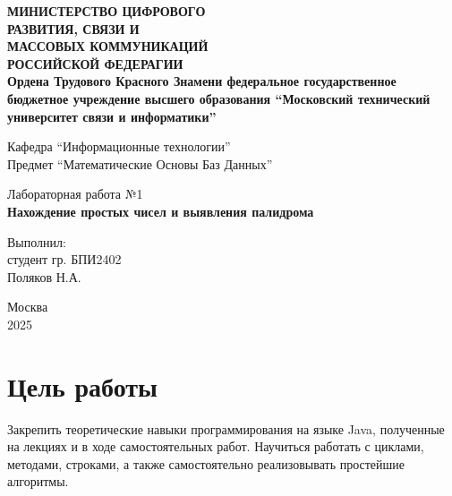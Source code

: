 \documentclass[a4paper, 17pt]{extarticle}
\begin{document}
\begin{titlepage}
  \begin{center}
    \small{ \bfseries{
    МИНИСТЕРСТВО ЦИФРОВОГО \\ РАЗВИТИЯ, СВЯЗИ И \\ МАССОВЫХ
    КОММУНИКАЦИЙ \\ РОССИЙСКОЙ ФЕДЕРАГИИ \\ Ордена Трудового Красного
    Знамени федеральное государственное бюджетное учреждение высшего
    образования \enquote{Московский технический университет связи и
    информатики}}\\
  \mdseries}

    \vspace{1.7cm}

    \normalsize{Кафедра \enquote{Информационные технологии}} \\
    \normalsize{Предмет \enquote{Математические Основы Баз Данных}}

    \vspace{0.3cm}
    \huge{Лабораторная работа №1} \\
    \large{\textbf{Нахождение простых чисел и выявления палидрома}} \\
    \vspace{0.3cm}

    \vspace{2.7cm}

    \raggedleft 
    \normalsize{Выполнил: \\ студент гр. БПИ2402 
    \\\vspace{0.125cm} Поляков Н.А.\\}
    \centering

    \vspace{\fill}

    Москва \\ 2025

  \end{center}
\end{titlepage}

\tableofcontents
\pagebreak

\section{Цель работы}
Закрепить теоретические навыки программирования на языке Java, полученные на
лекциях и в ходе самостоятельных работ. Научиться работать с циклами, методами,
строками, а также самостоятельно реализовывать простейшие алгоритмы.
\end{document}
